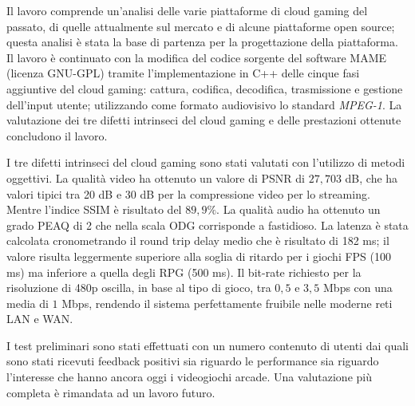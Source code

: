 Il lavoro comprende un'analisi delle varie piattaforme di cloud gaming del passato, di quelle attualmente sul mercato e di alcune piattaforme open source; questa analisi è stata la base di partenza per la progettazione della piattaforma. Il lavoro è continuato con la modifica del codice sorgente del software MAME (licenza GNU-GPL) tramite l'implementazione in C++ delle cinque fasi aggiuntive del cloud gaming: cattura, codifica, decodifica, trasmissione e gestione dell'input utente; utilizzando come formato audiovisivo lo standard \textit{MPEG-1}. La valutazione dei tre difetti intrinseci del cloud gaming e delle prestazioni ottenute concludono il lavoro.

I tre difetti intrinseci del cloud gaming sono stati valutati con l'utilizzo di metodi oggettivi.
La qualità video ha ottenuto un valore di PSNR di $27,703$ \si{dB}, che ha valori tipici tra 20 \si{dB} e 30 \si{dB} per la compressione video per lo streaming. Mentre l'indice SSIM è risultato del $89,9\%$.
La qualità audio ha ottenuto un grado PEAQ di 2 che nella scala ODG corrisponde a fastidioso.
La latenza è stata calcolata cronometrando il round trip delay medio che è risultato di 182 ms; il valore risulta leggermente superiore alla soglia di ritardo per i giochi FPS (100 ms) ma inferiore a quella degli RPG (500 ms).
Il bit-rate richiesto per la risoluzione di 480p oscilla, in base al tipo di gioco, tra $0,5$ e $3,5$ Mbps con una media di $1$ Mbps, rendendo il sistema perfettamente fruibile nelle moderne reti LAN e WAN.

I test preliminari sono stati effettuati con un numero contenuto di utenti dai quali sono stati ricevuti feedback positivi sia riguardo le performance sia riguardo l'interesse che hanno ancora oggi i videogiochi arcade. Una valutazione più completa è rimandata ad un lavoro futuro.

